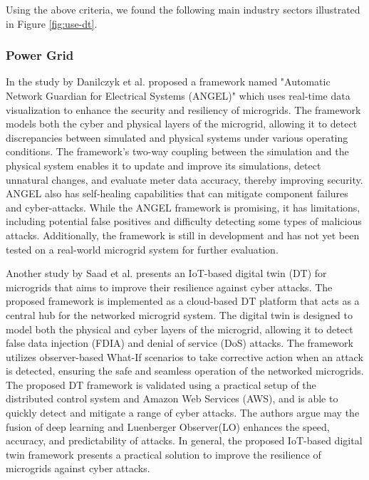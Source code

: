 Using the above criteria, we found the following main industry sectors illustrated in Figure \ref{fig:use-dt}. \\

\begin{center}
 

\label{fig:use-dt}
\end{center}
\subsubsection{Power Grid}
In the study by Danilczyk et al.\cite{williamdanilczykANGELIntelligentDigital2019} proposed a framework named "Automatic Network Guardian for Electrical Systems (ANGEL)" which uses real-time data visualization to enhance the security and resiliency of microgrids. The framework models both the cyber and physical layers of the microgrid, allowing it to detect discrepancies between simulated and physical systems under various operating conditions. The framework's two-way coupling between the simulation and the physical system enables it to update and improve its simulations, detect unnatural changes, and evaluate meter data accuracy, thereby improving security. ANGEL also has self-healing capabilities that can mitigate component failures and cyber-attacks. While the ANGEL framework is promising, it has limitations, including potential false positives and difficulty detecting some types of malicious attacks. Additionally, the framework is still in development and has not yet been tested on a real-world microgrid system for further evaluation.

Another study by Saad et al.\cite{saadImplementationIoTBasedDigital2020} presents an IoT-based digital twin (DT) for microgrids that aims to improve their resilience against cyber attacks. The proposed framework is implemented as a cloud-based DT platform that acts as a central hub for the networked microgrid system. The digital twin is designed to model both the physical and cyber layers of the microgrid, allowing it to detect false data injection (FDIA) and denial of service (DoS) attacks. The framework utilizes observer-based What-If scenarios to take corrective action when an attack is detected, ensuring the safe and seamless operation of the networked microgrids. The proposed DT framework is validated using a practical setup of the distributed control system and Amazon Web Services (AWS), and is able to quickly detect and mitigate a range of cyber attacks. The authors argue may the fusion of deep learning and Luenberger Observer(LO) enhances the speed, accuracy, and predictability of attacks. In general, the proposed IoT-based digital twin framework presents a practical solution to improve the resilience of microgrids against cyber attacks.

